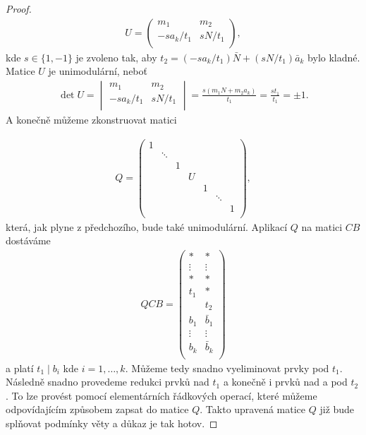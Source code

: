 \begin{proof}
\begin{align*}
U =
    \begin{pmatrix}
        m_1         & m_2      \\
        -sa_k / t_1 & sN / t_1 \\
    \end{pmatrix}
,
\end{align*}
kde $ s \in \{1, -1\} $ je zvoleno tak, aby
$ t_2 = (-sa_k / t_1) \bar{N} + (sN / t_1) \bar{a}_k $ bylo kladné. Matice $ U $
je unimodulární, neboť
\begin{align*}
\det U =
    \begin{vmatrix}
        m_1         & m_2      \\
        -sa_k / t_1 & sN / t_1 \\
    \end{vmatrix}
    = \frac{s(m_1 N + m_2 a_k)}{t_1} = \frac{s t_1}{t_1} = \pm 1
.
\end{align*}
A konečně můžeme zkonstruovat matici

\begin{align*}
Q =
    \begin{pmatrix}
        1 &        &   &   &   &        &   \\
          & \ddots &   &   &   &        &   \\
          &        & 1 &   &   &        &   \\
          &        &   & U &   &        &   \\
          &        &   &   & 1 &        &   \\
          &        &   &   &   & \ddots &   \\
          &        &   &   &   &        & 1 \\
    \end{pmatrix}
,
\end{align*}
která, jak plyne z předchozího, bude také unimodulární. Aplikací $ Q $ na matici
$ CB $ dostáváme
\begin{align*}
QCB =
    \begin{pmatrix}
        \ast   & \ast      \\
        \vdots & \vdots    \\
        \ast   & \ast      \\
        t_1    & \ast      \\
               & t_2       \\
        b_1    & \bar{b}_1 \\
        \vdots & \vdots    \\
        b_k    & \bar{b}_k \\
    \end{pmatrix}
\end{align*}
a platí $ t_1 \mid b_i$ kde $ i = 1, \dots, k $. Můžeme tedy snadno vyeliminovat
prvky pod $ t_1 $. Následně snadno provedeme redukci prvků nad $ t_1 $ a
konečně i prvků nad a pod $ t_2 $. To lze provést pomocí elementárních řádkových
operací, které můžeme odpovídajícím způsobem zapsat do matice $ Q $. Takto
upravená matice $ Q $ již bude splňovat podmínky věty a důkaz je tak hotov.

\end{proof}





